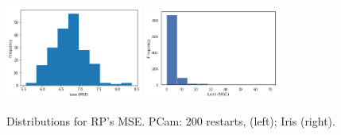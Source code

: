 \documentclass[letter]{article}
\begin{document}
\begin{figure}
  \centering
  \includegraphics[width=0.4\textwidth]{images/randomDistr.png}
  \includegraphics[width=0.4\textwidth]{images/randomDistrIris.png}
  \caption{Distributions for RP's MSE. PCam: 200 restarts, (left); Iris (right).}
\end{figure}
\end{document}
